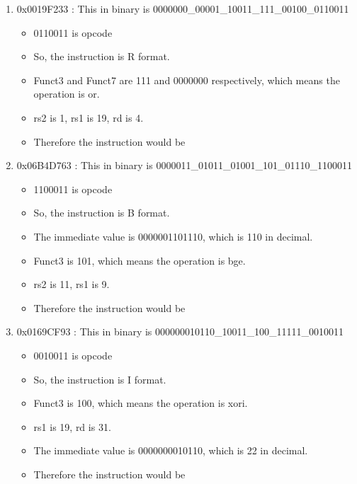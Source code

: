 \begin{enumerate}
    \item 0x0019F233 : This in binary is 0000000\_00001\_10011\_111\_00100\_0110011
        \begin{itemize}
            \item 0110011 is opcode 
            \item So, the instruction is R format.
            \item Funct3 and Funct7 are 111 and 0000000 respectively, which means the operation is or.
            \item rs2 is 1, rs1 is 19, rd is 4.
            \item Therefore the instruction would be 
        \end{itemize}
    \item 0x06B4D763 : This in binary is 0000011\_01011\_01001\_101\_01110\_1100011
        \begin{itemize}
            \item 1100011 is opcode
            \item So, the instruction is B format.
            \item The immediate value is 0000001101110, which is 110 in decimal.
            \item Funct3 is 101, which means the operation is bge.
            \item rs2 is 11, rs1 is 9.
            \item Therefore the instruction would be 
        \end{itemize}
    \item 0x0169CF93 : This in binary is 000000010110\_10011\_100\_11111\_0010011
        \begin{itemize}
            \item 0010011 is opcode
            \item So, the instruction is I format.
            \item Funct3 is 100, which means the operation is xori.
            \item rs1 is 19, rd is 31.
            \item The immediate value is 0000000010110, which is 22 in decimal.
            \item Therefore the instruction would be 
        \end{itemize}
\end{enumerate}

